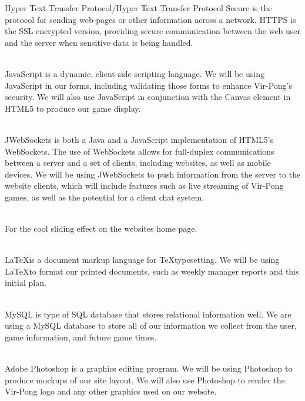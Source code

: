 \begin{description}
			Hyper Text Transfer Protocol/Hyper Text Transfer Protocol Secure is the  protocol for sending web-pages or other information across a network. HTTPS is the SSL encrypted version, providing secure communication between the web user and the server when sensitive data is being handled.
		\item[JavaScript - \url{http://w3schools.com/js}] \hfill \\
			JavaScript is a dynamic, client-side scripting language. We will be using JavaScript in our forms, including validating those forms to enhance Vir-Pong's security. We will also use JavaScript in conjunction with the Canvas element in HTML5 to produce our game display.
		\item[JWebSockets - \url{http://jwebsocket.org/}] \hfill \\
			JWebSockets is both a Java and a JavaScript implementation of HTML5's WebSockets. The use of WebSockets allows for full-duplex communications between a server and a set of clients, including websites, as well as mobile devices. We will be using JWebSockets to push information from the server to the website clients, which will include features such as live streaming of Vir-Pong games, as well as the potential for a client chat system.
		\item[Coda-Slider - \url{http://www.ndoherty.biz/2009/10/coda-slider-2/}] \hfill \\
			For the cool sliding effect on the websites home page.
		\item[\LaTeX - \url{http://latex-project.org}] \hfill \\
			\LaTeX is a document markup language for \TeX typesetting. We will be using \LaTeX to format our printed documents, such as weekly manager reports and this initial plan.
		\item[MySQL -  \url{http://dev.mysql.com/downloads/mysql/}] \hfill \\
			MySQL is  type of SQL database that stores relational information well. We are using a MySQL database to store all of our information we collect from the user, game information, and future game times.
		\item[Photoshop - \url{http://photoshop.com}] \hfill \\
			Adobe Photoshop is a graphics editing program. We will be using Photoshop to produce mockups of our site layout. We will also use Photoshop to render the Vir-Pong logo and any other graphics used on our website.
		\item[PHP - \url{http://php.net}] \hfill \\

\end{description}
